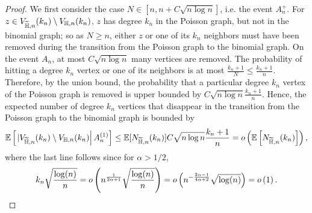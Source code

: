 \begin{proof}
We first consider the case $N \in [n,n+C\sqrt{n\log n}]$, i.e. the event $A_n^{+}$. For $z \in V_{\widetilde{\mathbb{H}},n}(k_n) \setminus V_{\mathbb{H},n}(k_n)$, $z$ has degree $k_n$ in the Poisson graph, but not in the binomial graph;  so as $N \geq n$, either $z$ or one of its $k_n$ neighbors must have been removed during the transition from the Poisson graph to the binomial graph. On the event $A_n$, at most $C\sqrt{n\log n}$ many vertices are removed. The probability of hitting a degree $k_n$ vertex or one of its neighbors is at most $\frac{k_n+1}{N} \leq \frac{k_n+1}{n}$. Therefore, by the union bound, the probability that a particular degree $k_n$ vertex of the Poisson graph is removed is upper bounded by $C\sqrt{n\log n}\frac{k_n+1}{n}$. Hence, the expected number of degree $k_n$ vertices that disappear in the transition from the Poisson graph to the binomial graph is bounded by 
\[
	\mathbb{E}\left[\left.|V_{\widetilde{\mathbb{H}},n}(k_n) \setminus V_{\mathbb{H},n}(k_n)\right|A_n^{(1)}\right]\leq \mathbb{E}[N_{\widetilde{\mathbb{H}},n}(k_n)] C\sqrt{n \log n}\frac{k_n+1}{n}  
	= o\left(\mathbb{E}\left[N_{\widetilde{\mathbb{H}},n}(k_n)\right]\right),
\] 
where the last line follows since for $\alpha > 1/2$,
\[
	k_n \sqrt{\frac{\log(n)}{n}} = o\left(n^{\frac{1}{2\alpha + 1}}\sqrt{\frac{\log(n)}{n}}\right) 
	= o\left(n^{-\frac{2\alpha - 1}{4\alpha + 2}} \sqrt{\log(n)}\right) = o\left(1\right).
\]


\end{proof}
